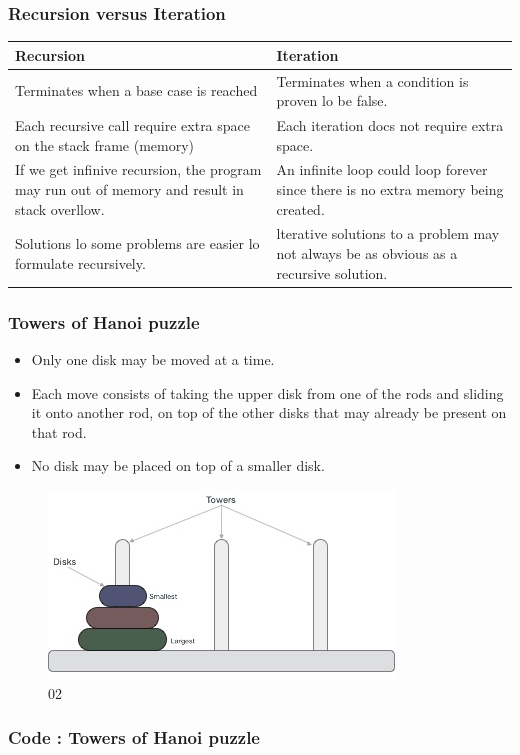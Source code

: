 \documentclass{beamer}
\begin{document}
\begin{frame}
\frametitle{Recursion versus Iteration}
\begin{tabular}{|L{5cm}|L{5cm}|}
\hline
\textbf{Recursion} & \textbf{Iteration}  \\
\hline
Terminates when a base case is reached 
& Terminates when a condition is proven lo be false. \\
\hline
Each recursive call require extra space on the stack frame (memory) 
& Each iteration docs not require extra space.  \\
\hline
If we get infinive recursion, the program may run out of memory 
and result in stack overllow.
& An infinite loop could loop forever since there is no extra memory being created.  \\
\hline
Solutions lo some problems are easier lo formulate recursively.
& lterative solutions to a problem may not always be as obvious as a recursive solution. \\
\hline
\end{tabular}
\end{frame}


\begin{frame}
\frametitle{Towers of Hanoi puzzle}
\begin{itemize}
\item Only one disk may be moved at a time.
\item Each move consists of taking the upper disk from one of the rods and sliding it onto another rod, on top
of the other disks that may already be present on that rod.
\item No disk may be placed on top of a smaller disk.
\end{itemize}
\begin{figure}
\includegraphics[scale=0.5]{img/ch01_tower_of_hanoi.jpg}
\caption{02}
\end{figure}
\end{frame}

\begin{frame}
\frametitle{Code : Towers of Hanoi puzzle}

%
%
%

\end{frame}
\end{document}

